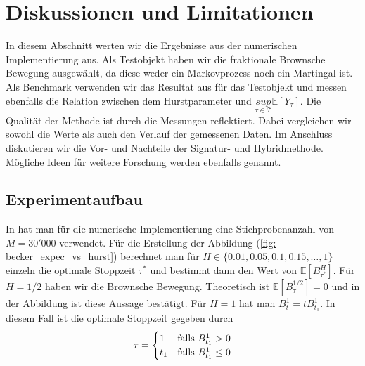 \documentclass[12pt,titlepage,headsepline]{article}
\begin{document}
    \section{Diskussionen und Limitationen}
      In diesem Abschnitt werten wir die Ergebnisse aus der numerischen Implementierung aus. Als Testobjekt haben wir die fraktionale Brownsche Bewegung ausgewählt, da diese weder ein Markovprozess noch ein Martingal ist. Als Benchmark verwenden wir das Resultat aus \cite{becker_deep_2019} für das Testobjekt und messen ebenfalls die Relation zwischen dem Hurstparameter und $\underset{\tau \in \mathcal{T}}{sup} \mathbb{E}[Y_{\tau}]$. Die Qualität der Methode ist durch die Messungen reflektiert. Dabei vergleichen wir sowohl die Werte als auch den Verlauf der gemessenen Daten.
      \hfill\break
      Im Anschluss diskutieren wir die Vor- und Nachteile der Signatur- und Hybridmethode. Mögliche Ideen für weitere Forschung werden ebenfalls genannt.
      \subsection{Experimentaufbau}
      In \cite{becker_deep_2019} hat man für die numerische Implementierung eine Stichprobenanzahl von $M = 30'000$ verwendet. Für die Erstellung der Abbildung (\ref{fig: becker_expec_vs_hurst}) berechnet man für $H \in \{0.01,0.05,0.1,0.15,\ldots,1\}$ einzeln die optimale Stoppzeit $\tau^*$ und bestimmt dann den Wert von $\mathbb{E}[B_{\tau^*}^H]$. Für
      $H=1/2$ haben wir die Brownsche Bewegung. Theoretisch ist $\mathbb{E}[B^{1/2}_{\tau}] = 0$ und in der Abbildung ist diese Aussage bestätigt. Für $H = 1$ hat man $B_t^1 = tB_{t_1}^1$. In diesem Fall ist die optimale Stoppzeit gegeben durch
      \begin{align*}
        \tau =
        \begin{cases}
          1 & \textup{falls } B_{t_1}^1 > 0 \\
          t_1 & \textup{falls } B_{t_1}^1 \leq 0
        \end{cases}
      \end{align*}
\end{document}
